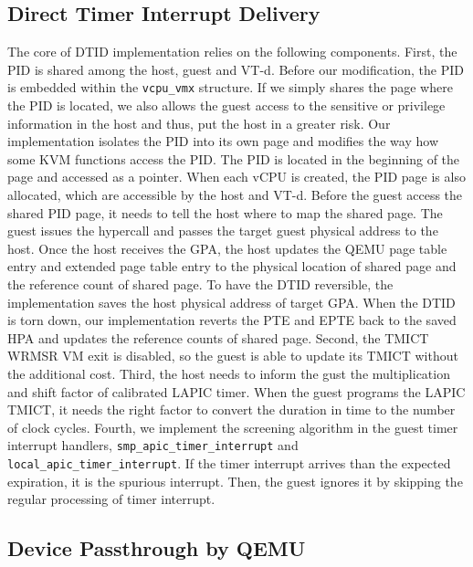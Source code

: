 \subsection{Direct Timer Interrupt Delivery}
The core of DTID implementation relies on the following
components. First, the PID is shared among the host, guest and
VT-d. Before our modification, the PID is embedded within the
\texttt{vcpu\_vmx} structure. If we simply shares the page
where the PID is located, we also allows the guest access to
the sensitive or privilege information in the host and thus,
put the host in a greater risk. Our implementation isolates
the PID into its own page and modifies the way how some KVM
functions access the PID. The PID is located in the beginning
of the page and accessed as a pointer. When each vCPU is
created, the PID page is also allocated, which are accessible
by the host and VT-d. Before the guest access the shared PID
page, it needs to tell the host where to map the shared page.
The guest issues the hypercall and passes the target guest
physical address to the host. Once the host receives the GPA,
the host updates the QEMU page table entry and extended page
table entry to the physical location of shared page and the
reference count of shared page. To have the DTID reversible,
the implementation saves the host physical address of target
GPA. When the DTID is torn down, our implementation reverts
the PTE and EPTE back to the saved HPA and updates the
reference counts of shared page. Second, the TMICT WRMSR VM
exit is disabled, so the guest is able to update its TMICT
without the additional cost. Third, the host needs to inform
the gust the multiplication and shift factor of calibrated
LAPIC timer. When the guest programs the LAPIC TMICT, it needs
the right factor to convert the duration in time to the number
of clock cycles. Fourth, we implement the screening algorithm
in the guest timer interrupt handlers,
\texttt{smp\_apic\_timer\_interrupt} and
\texttt{local\_apic\_timer\_interrupt}. If the timer interrupt
arrives than the expected expiration, it is the spurious
interrupt. Then, the guest ignores it by skipping the regular
processing of timer interrupt.

\subsection{Device Passthrough by QEMU}

